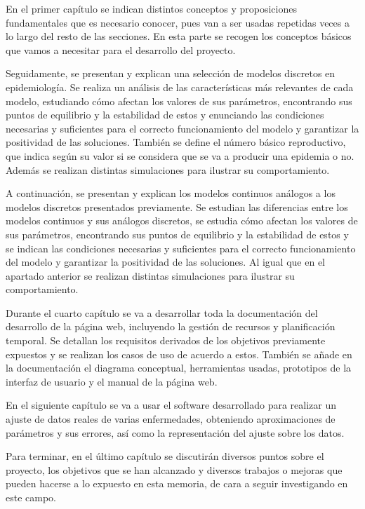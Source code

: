 En el primer capítulo se indican distintos conceptos y proposiciones fundamentales que es necesario conocer, pues van a ser usadas repetidas veces a lo largo del resto de las secciones. En esta parte se recogen los conceptos básicos que vamos a necesitar para el desarrollo del proyecto.

Seguidamente, se presentan y explican una selección de modelos discretos en epidemiología. Se realiza un análisis de las características más relevantes de cada modelo, estudiando cómo afectan los valores de sus parámetros, encontrando sus puntos de equilibrio y la estabilidad de estos y enunciando las condiciones necesarias y suficientes para el correcto funcionamiento del modelo y garantizar la positividad de las soluciones. También se define el número básico reproductivo, que indica según su valor si se considera que se va a producir una epidemia o no. Además se realizan distintas simulaciones para ilustrar su comportamiento. 

A continuación, se presentan y explican los modelos continuos análogos a los modelos discretos presentados previamente. Se estudian las diferencias entre los modelos continuos y sus análogos discretos, se estudia cómo afectan los valores de sus parámetros, encontrando sus puntos de equilibrio y la estabilidad de estos y se indican las condiciones necesarias y suficientes para el correcto funcionamiento del modelo y garantizar la positividad de las soluciones. Al igual que en el apartado anterior se realizan distintas simulaciones para ilustrar su comportamiento.

Durante el cuarto capítulo se va a desarrollar toda la documentación del desarrollo de la página web, incluyendo la gestión de recursos y planificación temporal. Se detallan los requisitos derivados de los objetivos previamente expuestos y se realizan los casos de uso de acuerdo a estos. También se añade en la documentación el diagrama conceptual, herramientas usadas, prototipos de la interfaz de usuario y el manual de la página web.

En el siguiente capítulo se va a usar el software desarrollado para realizar un ajuste de datos reales de varias enfermedades, obteniendo aproximaciones de parámetros y sus errores, así como la representación del ajuste sobre los datos.

Para terminar, en el último capítulo se discutirán diversos puntos sobre el proyecto, los objetivos que se han alcanzado y diversos trabajos o mejoras que pueden hacerse a lo expuesto en esta memoria, de cara a seguir investigando en este campo.


